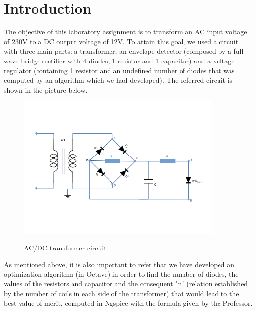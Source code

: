 \newpage
\section{Introduction}
\label{sec:introduction}

The objective of this laboratory assignment is to transform an AC input voltage of 230V to a DC output voltage of 12V. To attain this goal, we used a circuit with three main parts: a transformer, an envelope detector (composed by a full-wave bridge rectifier with 4 diodes, 1 resistor and 1 capacitor) and a voltage regulator (containing 1 resistor and an undefined number of diodes that was computed by an algorithm which we had developed). The referred circuit is shown in the picture below. 

\bigskip 

\begin{figure}[!ht] \centering
\caption{AC/DC transformer circuit}
\includegraphics[width=0.9\textwidth, scale=1.0]{DesenhoT3.pdf}  
\label{fig:circuit}
\end{figure}

As mentioned above, it is also important to refer that we have developed an optimization algorithm (in Octave) in order to find the number of diodes, the values of the resistors and capacitor and the consequent "n" (relation established by the number of coils in each side of the transformer) that would lead to the best value of merit, computed in Ngspice with the formula given by the Professor.   

